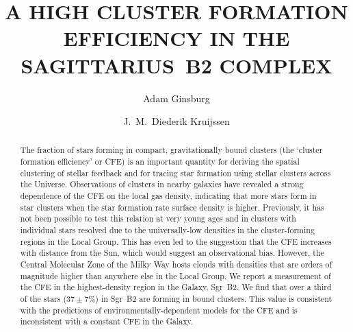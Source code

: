 \documentclass[twocolumn]{aastex62}
\begin{document}
\title{A HIGH CLUSTER FORMATION EFFICIENCY IN THE SAGITTARIUS~B2 COMPLEX}


\author[0000-0001-6431-9633]{Adam Ginsburg}

\author[0000-0002-8804-0212]{J.~M.\ Diederik Kruijssen}



\begin{abstract}
    The fraction of stars forming in compact, gravitationally bound clusters
    (the `cluster formation efficiency' or CFE) is an important quantity for
    deriving the spatial clustering of stellar feedback and for tracing star
    formation using stellar clusters across the Universe.  Observations of
    clusters in nearby galaxies have revealed a strong dependence of the CFE on
    the local gas density, indicating that more stars form in star clusters
    when the star formation rate surface density is higher. Previously, it has
    not been possible to test this relation at very young ages and in clusters
    with individual stars resolved due to the universally-low densities in the
    cluster-forming regions in the Local Group. This has even led to the
    suggestion that the CFE increases with distance from the Sun, which would
    suggest an observational bias.  However, the Central Molecular Zone of the
    Milky Way hosts clouds with densities that are orders of magnitude higher
    than anywhere else in the Local Group.  We report a measurement of the CFE
    in the highest-density region in the Galaxy, Sgr~B2.  We find that over a
    third of the stars ($37\pm7\%$)  in Sgr~B2 are forming in bound clusters.
    This value is consistent with the predictions of environmentally-dependent
    models for the CFE and is inconsistent with a constant CFE in the
    Galaxy.
    \vspace{10mm}
\end{abstract}
\end{document}
